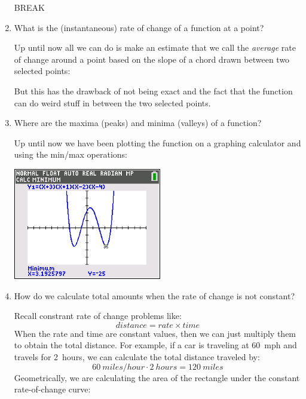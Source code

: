 \documentclass[letterpaper,12pt,fleqn]{article}
\begin{document}
\begin{enumerate}[left=0pt]
\begin{minipage}{2in}
\begin{center}
      BREAK
    \end{center}
  \end{minipage}

\item What is the (instantaneous) rate of change of a function at a point?

  Up until now all we can do is make an estimate that we call the \emph{average} rate of change around a point
  based on the slope of a chord drawn between two selected points:

  \begin{center}
  \end{center}

  But this has the drawback of not being exact and the fact that the function can do weird stuff in between the two
  selected points.

\item Where are the maxima (peaks) and minima (valleys) of a function?

  Up until now we have been plotting the function on a graphing calculator and using the min/max operations:

  \begin{center}
    \includegraphics[scale=0.65]{min.png}
  \end{center}

  \bigskip

\item How do we calculate total amounts when the rate of change is not constant?

  Recall constrant rate of change problems like:
  \[distance=rate\times time\]
  When the rate and time are constant values, then we can just multiply them to obtain the total distance.  For
  example, if a car is traveling at \SI{60}{mph} and travels for \SI{2}{hours}, we can calculate the total distance
  traveled by:
  \[\SI{60}{miles/hour}\cdot\SI{2}{hours}=\SI{120}{miles}\]
  Geometrically, we are calculating the area of the rectangle under the constant rate-of-change curve:


\end{enumerate}
\end{document}
